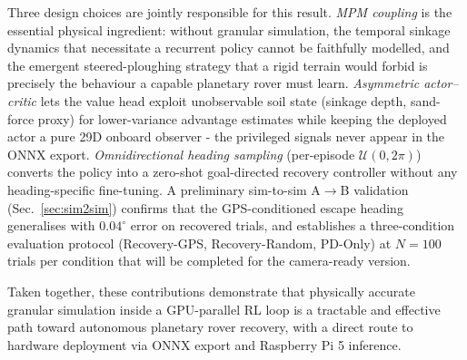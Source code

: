 \documentclass[conference]{IEEEtran}
\begin{document}
Three design choices are jointly responsible for this result.
\emph{MPM coupling} is the essential physical ingredient: without granular
simulation, the temporal sinkage dynamics that necessitate a recurrent policy
cannot be faithfully modelled, and the emergent steered-ploughing strategy that a
rigid terrain would forbid is precisely the behaviour a capable planetary rover
must learn.
\emph{Asymmetric actor--critic} lets the value head exploit unobservable soil
state (sinkage depth, sand-force proxy) for lower-variance advantage estimates
while keeping the deployed actor a pure 29D onboard observer - the privileged
signals never appear in the ONNX export.
\emph{Omnidirectional heading sampling} (per-episode $\mathcal{U}(0,2\pi)$)
converts the policy into a zero-shot goal-directed recovery controller without
any heading-specific fine-tuning. A preliminary sim-to-sim A$\to$B validation
(Sec.~\ref{sec:sim2sim}) confirms that the GPS-conditioned escape heading
generalises with $0.04^\circ$ error on recovered trials, and establishes a
three-condition evaluation protocol (Recovery-GPS, Recovery-Random, PD-Only) at
$N=100$ trials per condition that will be completed for the camera-ready version.

Taken together, these contributions demonstrate that physically accurate
granular simulation inside a GPU-parallel RL loop is a tractable and
effective path toward autonomous planetary rover recovery, with a direct route
to hardware deployment via ONNX export and Raspberry Pi 5 inference.

\balance


\end{document}
